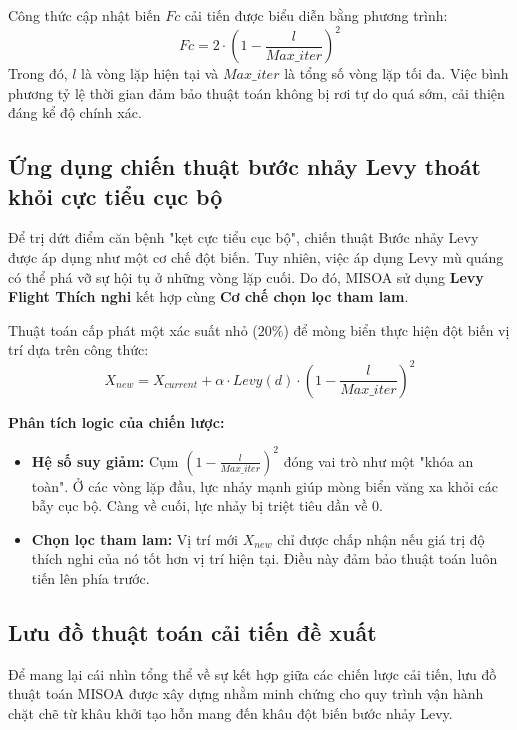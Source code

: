 \documentclass[12pt, a4paper]{article}
\begin{document}
Công thức cập nhật biến $Fc$ cải tiến được biểu diễn bằng phương trình:
\begin{equation}
Fc = 2 \cdot \left(1 - \frac{l}{Max\_iter}\right)^2
\end{equation}
Trong đó, $l$ là vòng lặp hiện tại và $Max\_iter$ là tổng số vòng lặp tối đa. Việc bình phương tỷ lệ thời gian đảm bảo thuật toán không bị rơi tự do quá sớm, cải thiện đáng kể độ chính xác.

\subsection{Ứng dụng chiến thuật bước nhảy Levy thoát khỏi cực tiểu cục bộ}
Để trị dứt điểm căn bệnh "kẹt cực tiểu cục bộ", chiến thuật Bước nhảy Levy \cite{levy_flight} được áp dụng như một cơ chế đột biến. Tuy nhiên, việc áp dụng Levy mù quáng có thể phá vỡ sự hội tụ ở những vòng lặp cuối. Do đó, MISOA sử dụng \textbf{Levy Flight Thích nghi} kết hợp cùng \textbf{Cơ chế chọn lọc tham lam}.

Thuật toán cấp phát một xác suất nhỏ ($20\%$) để mòng biển thực hiện đột biến vị trí dựa trên công thức:
\begin{equation}
X_{new} = X_{current} + \alpha \cdot Levy(d) \cdot \left(1 - \frac{l}{Max\_iter}\right)^2
\end{equation}

\textbf{Phân tích logic của chiến lược:}
\begin{itemize}
    \item \textbf{Hệ số suy giảm:} Cụm $\left(1 - \frac{l}{Max\_iter}\right)^2$ đóng vai trò như một "khóa an toàn". Ở các vòng lặp đầu, lực nhảy mạnh giúp mòng biển văng xa khỏi các bẫy cục bộ. Càng về cuối, lực nhảy bị triệt tiêu dần về 0.
    \item \textbf{Chọn lọc tham lam:} Vị trí mới $X_{new}$ chỉ được chấp nhận nếu giá trị độ thích nghi của nó tốt hơn vị trí hiện tại. Điều này đảm bảo thuật toán luôn tiến lên phía trước.
\end{itemize}

\subsection{Lưu đồ thuật toán cải tiến đề xuất}

Để mang lại cái nhìn tổng thể về sự kết hợp giữa các chiến lược cải tiến, lưu đồ thuật toán MISOA được xây dựng nhằm minh chứng cho quy trình vận hành chặt chẽ từ khâu khởi tạo hỗn mang đến khâu đột biến bước nhảy Levy.
\end{document}
